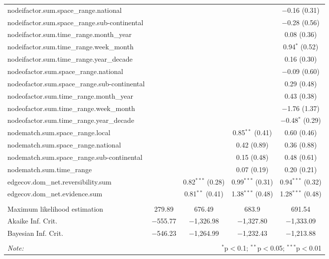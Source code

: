 \documentclass[9pt,]{article}
\begin{document}
\begin{tabular}{@{\extracolsep{5pt}}lcccc}
  nodeifactor.sum.space\_range.national &  &  &  & $-$0.16 (0.31) \\
  nodeifactor.sum.space\_range.sub-continental &  &  &  & $-$0.28 (0.56) \\
  nodeifactor.sum.time\_range.month\_year &  &  &  & 0.08 (0.36) \\
  nodeifactor.sum.time\_range.week\_month &  &  &  & 0.94$^{*}$ (0.52) \\
  nodeifactor.sum.time\_range.year\_decade &  &  &  & 0.16 (0.30) \\
  nodeofactor.sum.space\_range.national &  &  &  & $-$0.09 (0.60) \\
  nodeofactor.sum.space\_range.sub-continental &  &  &  & 0.29 (0.48) \\
  nodeofactor.sum.time\_range.month\_year &  &  &  & 0.43 (0.38) \\
  nodeofactor.sum.time\_range.week\_month &  &  &  & $-$1.76 (1.37) \\
  nodeofactor.sum.time\_range.year\_decade &  &  &  & $-$0.48$^{*}$ (0.29) \\
  nodematch.sum.space\_range.local &  &  & 0.85$^{**}$ (0.41) & 0.60 (0.46) \\
  nodematch.sum.space\_range.national &  &  & 0.42 (0.89) & 0.36 (0.88) \\
  nodematch.sum.space\_range.sub-continental &  &  & 0.15 (0.48) & 0.48 (0.61) \\
  nodematch.sum.time\_range &  &  & 0.07 (0.19) & 0.20 (0.21) \\
  edgecov.dom\_net.reversibility.sum &  & 0.82$^{***}$ (0.28) & 0.99$^{***}$ (0.31) & 0.94$^{***}$ (0.32) \\
  edgecov.dom\_net.evidence.sum &  & 0.81$^{**}$ (0.41) & 1.38$^{***}$ (0.48) & 1.28$^{***}$ (0.48) \\
 \hline \\[-1.8ex]
Maximum likelihood estimation & 279.89 & 676.49 & 683.9 & 691.54 \\
Akaike Inf. Crit. & $-$555.77 & $-$1,326.98 & $-$1,327.80 & $-$1,333.09 \\
Bayesian Inf. Crit. & $-$546.23 & $-$1,264.99 & $-$1,232.43 & $-$1,213.88 \\
\hline
\hline \\[-1.8ex]
\textit{Note:}  & \multicolumn{4}{r}{$^{*}$p$<$0.1; $^{**}$p$<$0.05; $^{***}$p$<$0.01} \\
\end{tabular}

\endgroup
\end{document}
